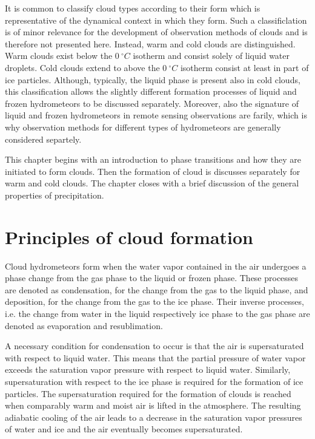 It is common to classify cloud types according to their form which is
representative of the dynamical context in which they form. Such a
classificlation is of minor relevance for the development of observation methods
of clouds and is therefore not presented here. Instead, warm and cold clouds are
distinguished. Warm clouds exist below the $0\ \unit{^\circ C}$ isotherm and
consist solely of liquid water droplets. Cold clouds extend to above the
$0\ \unit{^\circ C}$ isotherm consist at least in part of ice particles.
Although, typically, the liquid phase is present also in cold clouds, this
classification allows the slightly different formation processes of liquid and
frozen hydrometeors to be discussed separately. Moreover, also the signature of
liquid and frozen hydrometeors in remote sensing observations are farily, which
is why observation methods for different types of hydrometeors are generally
considered separtely.

This chapter begins with an introduction to phase transitions and how they are
initiated to form clouds. Then the formation of cloud is discusses separately
for warm and cold clouds. The chapter closes with a brief discussion of the general
properties of precipitation.

\section{Principles of cloud formation}

Cloud hydrometeors form when the water vapor contained in the air undergoes a
phase change from the gas phase to the liquid or frozen phase. These processes
are denoted as condensation, for the change from the gas to the liquid phase,
and deposition, for the change from the gas to the ice phase. Their inverse
processes, i.e. the change from water in the liquid respectively ice phase to
the gas phase are denoted as evaporation and resublimation.

A necessary condition for condensation to occur is that the air is
supersaturated with respect to liquid water. This means that the partial
pressure of water vapor exceeds the saturation vapor pressure with respect to
liquid water. Similarly, supersaturation with respect to the ice phase is
required for the formation of ice particles. The supersaturation required for
the formation of clouds is reached when comparably warm and moist air is lifted
in the atmosphere. The resulting adiabatic cooling of the air leads to a
decrease in the saturation vapor pressures of water and ice and the air eventually
becomes supersaturated.

